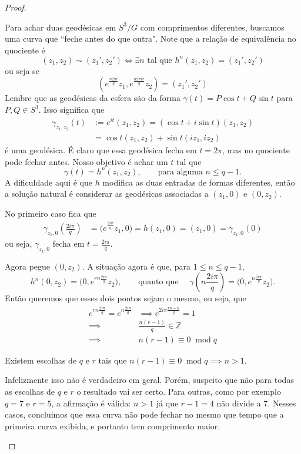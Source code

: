 \begin{proof}
\begin{enumerate}[label=(\alph*)]
\begin{enumerate}[label=(\roman*)]
	Para achar duas geodésicas em \(S^3/G\) com comprimentos diferentes, buscamos uma curva que ``feche antes do que outra". Note que a relação de equivalência no quociente é
	\[(z_1,z_2) \sim (z_1',z_2') \iff \exists n \text{ tal que }h^n(z_1,z_2)=(z_1',z_2') \]
ou seja	se
	\begin{equation}\label{eq:lens}\left(e^{\frac{n2\pi i}{q}}z_1,e^{\frac{n2\pi i r}{q}}z_2\right) = (z_1',z_2')\end{equation}
	Lembre que as geodésicas da esfera são da forma \(\gamma(t)=P\cos t+Q\sin t\) para \(P,Q \in S^3\). Isso significa que
\begin{align*}\gamma_{z_1,z_2}(t)&:=e^{it}(z_1,z_2)=(\cos t+i\sin t)(z_1,z_2)\\
&=\cos t(z_1,z_2)+\sin t(iz_1,iz_2)\end{align*}
é uma geodésica. É claro que essa geodésica fecha em \(t=2\pi\), mas no quociente pode fechar antes. Nosso objetivo é achar um \(t\) tal que \[\gamma(t)=h^n(z_1,z_2),\qquad  \text{para alguma \(n \leq  q-1\)}.\]
A dificuldade aqui é que \(h\) modifica as duas entradas de formas diferentes, então a solução natural é considerar as geodésicas associadas a \((z_1,0)\) e \((0,z_2)\).

No primeiro caso fica que
\begin{align*}
\gamma_{z_1,0}\left(\frac{2i\pi}{q}\right)&=\Big(e^{\frac{2i\pi}{q}}z_1,0\Big)=h(z_1,0)=(z_1,0)=\gamma_{z_1,0}(0)
\end{align*}
ou seja, \(\gamma_{z_1,0}\) fecha em \(t=\frac{2i\pi}{q}\).

Agora pegue \((0,z_2)\). A situação agora é que, para \(1\leq n \leq q-1\),
\[h^n(0,z_2)=\Big(0,e^{rn\frac{2i\pi }{q}}z_2\Big), \qquad \text{quanto que } \quad \gamma\left(n\frac{2i\pi}{q}\right)=\Big(0,e^{n\frac{2i\pi}{q}}z_2\Big).\]
Então queremos que esses dois pontos sejam o mesmo, ou seja, que
\begin{align*}
e^{rn\frac{2i\pi}{q}}=e^{n\frac{2i\pi}{q}} &\implies e^{2i\pi\frac{rn-n}{q}}=1\\
\implies & \frac{n(r-1)}{q} \in \mathbb{Z}\\
\implies  & n(r-1)\equiv 0 \;\operatorname{mod} q
\end{align*}

\begin{claim}\leavevmode
	Existem escolhas de \(q\) e \(r\) tais que \(n(r-1)\equiv 0 \;\operatorname{mod} q \implies n>1\).
\end{claim}
Infelizmente isso não é verdadeiro em geral. Porém, suspeito que não para todas as escolhas de \(q\) e \(r\) o resultado vai ser certo. Para outras, como por exemplo \(q=7\) e \(r=5\), a afirmação é válida: \(n>1\) já que \(r-1=4\) não divide a \(7\). Nesses casos, concluimos que essa curva não pode fechar no mesmo que tempo que a primeira curva exibida, e portanto tem comprimento maior.


\end{enumerate}
\end{enumerate}
\end{proof}
